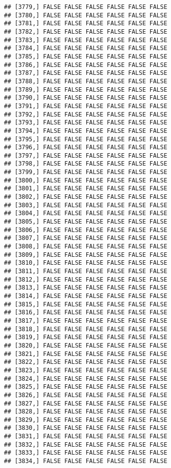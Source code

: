 \documentclass[
]{article}
\begin{document}
\begin{verbatim}
## [3779,] FALSE FALSE FALSE FALSE FALSE FALSE
## [3780,] FALSE FALSE FALSE FALSE FALSE FALSE
## [3781,] FALSE FALSE FALSE FALSE FALSE FALSE
## [3782,] FALSE FALSE FALSE FALSE FALSE FALSE
## [3783,] FALSE FALSE FALSE FALSE FALSE FALSE
## [3784,] FALSE FALSE FALSE FALSE FALSE FALSE
## [3785,] FALSE FALSE FALSE FALSE FALSE FALSE
## [3786,] FALSE FALSE FALSE FALSE FALSE FALSE
## [3787,] FALSE FALSE FALSE FALSE FALSE FALSE
## [3788,] FALSE FALSE FALSE FALSE FALSE FALSE
## [3789,] FALSE FALSE FALSE FALSE FALSE FALSE
## [3790,] FALSE FALSE FALSE FALSE FALSE FALSE
## [3791,] FALSE FALSE FALSE FALSE FALSE FALSE
## [3792,] FALSE FALSE FALSE FALSE FALSE FALSE
## [3793,] FALSE FALSE FALSE FALSE FALSE FALSE
## [3794,] FALSE FALSE FALSE FALSE FALSE FALSE
## [3795,] FALSE FALSE FALSE FALSE FALSE FALSE
## [3796,] FALSE FALSE FALSE FALSE FALSE FALSE
## [3797,] FALSE FALSE FALSE FALSE FALSE FALSE
## [3798,] FALSE FALSE FALSE FALSE FALSE FALSE
## [3799,] FALSE FALSE FALSE FALSE FALSE FALSE
## [3800,] FALSE FALSE FALSE FALSE FALSE FALSE
## [3801,] FALSE FALSE FALSE FALSE FALSE FALSE
## [3802,] FALSE FALSE FALSE FALSE FALSE FALSE
## [3803,] FALSE FALSE FALSE FALSE FALSE FALSE
## [3804,] FALSE FALSE FALSE FALSE FALSE FALSE
## [3805,] FALSE FALSE FALSE FALSE FALSE FALSE
## [3806,] FALSE FALSE FALSE FALSE FALSE FALSE
## [3807,] FALSE FALSE FALSE FALSE FALSE FALSE
## [3808,] FALSE FALSE FALSE FALSE FALSE FALSE
## [3809,] FALSE FALSE FALSE FALSE FALSE FALSE
## [3810,] FALSE FALSE FALSE FALSE FALSE FALSE
## [3811,] FALSE FALSE FALSE FALSE FALSE FALSE
## [3812,] FALSE FALSE FALSE FALSE FALSE FALSE
## [3813,] FALSE FALSE FALSE FALSE FALSE FALSE
## [3814,] FALSE FALSE FALSE FALSE FALSE FALSE
## [3815,] FALSE FALSE FALSE FALSE FALSE FALSE
## [3816,] FALSE FALSE FALSE FALSE FALSE FALSE
## [3817,] FALSE FALSE FALSE FALSE FALSE FALSE
## [3818,] FALSE FALSE FALSE FALSE FALSE FALSE
## [3819,] FALSE FALSE FALSE FALSE FALSE FALSE
## [3820,] FALSE FALSE FALSE FALSE FALSE FALSE
## [3821,] FALSE FALSE FALSE FALSE FALSE FALSE
## [3822,] FALSE FALSE FALSE FALSE FALSE FALSE
## [3823,] FALSE FALSE FALSE FALSE FALSE FALSE
## [3824,] FALSE FALSE FALSE FALSE FALSE FALSE
## [3825,] FALSE FALSE FALSE FALSE FALSE FALSE
## [3826,] FALSE FALSE FALSE FALSE FALSE FALSE
## [3827,] FALSE FALSE FALSE FALSE FALSE FALSE
## [3828,] FALSE FALSE FALSE FALSE FALSE FALSE
## [3829,] FALSE FALSE FALSE FALSE FALSE FALSE
## [3830,] FALSE FALSE FALSE FALSE FALSE FALSE
## [3831,] FALSE FALSE FALSE FALSE FALSE FALSE
## [3832,] FALSE FALSE FALSE FALSE FALSE FALSE
## [3833,] FALSE FALSE FALSE FALSE FALSE FALSE
## [3834,] FALSE FALSE FALSE FALSE FALSE FALSE

\end{verbatim}
\end{document}
